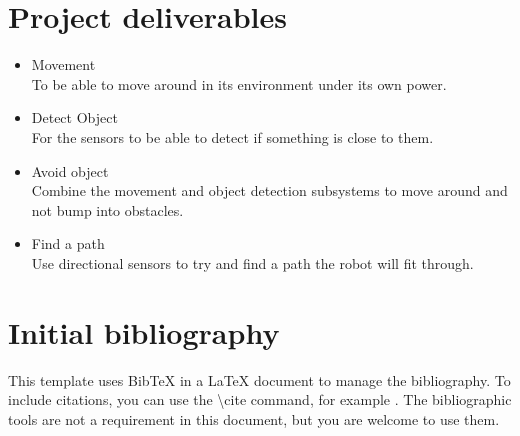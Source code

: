 \documentclass[11pt,fleqn,twoside]{article}
\begin{document}

\section{Project deliverables}
\begin{itemize}
\item Movement
\\To be able to move around in its environment under its own power.
\item Detect Object
\\For the sensors to be able to detect if something is close to them.
\item Avoid object
\\Combine the movement and object detection subsystems to move around and not bump into obstacles.
\item Find a path
\\Use directional sensors to try and find a path the robot will fit through.
\end{itemize}

\section{Initial bibliography}

This template uses BibTeX in a LaTeX document to manage the bibliography. To include citations, you 
can use the \textbackslash cite command, for example \cite{NumericalRecipes}\cite{MarksPaper}\cite{FailBlog}\cite{kittenpic_ref}.  The bibliographic tools are not a requirement in this document, but you are welcome to use them.  


\renewcommand{\refname}{}  %
\end{document}
